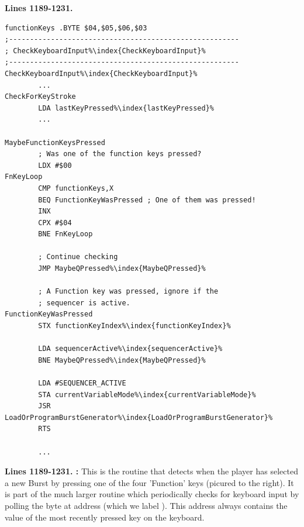 \clearpage
\textbf{Lines 1189-1231. }
\begin{lstlisting}[escapechar=\%]
functionKeys .BYTE $04,$05,$06,$03
;-------------------------------------------------------
; CheckKeyboardInput%\index{CheckKeyboardInput}%
;-------------------------------------------------------
CheckKeyboardInput%\index{CheckKeyboardInput}%   
        ...
CheckForKeyStroke   
        LDA lastKeyPressed%\index{lastKeyPressed}%
        ...

MaybeFunctionKeysPressed   
        ; Was one of the function keys pressed?
        LDX #$00
FnKeyLoop   
        CMP functionKeys,X
        BEQ FunctionKeyWasPressed ; One of them was pressed!
        INX 
        CPX #$04
        BNE FnKeyLoop

        ; Continue checking
        JMP MaybeQPressed%\index{MaybeQPressed}%

        ; A Function key was pressed, ignore if the 
        ; sequencer is active.
FunctionKeyWasPressed   
        STX functionKeyIndex%\index{functionKeyIndex}%

        LDA sequencerActive%\index{sequencerActive}%
        BNE MaybeQPressed%\index{MaybeQPressed}%

        LDA #SEQUENCER_ACTIVE
        STA currentVariableMode%\index{currentVariableMode}%
        JSR LoadOrProgramBurstGenerator%\index{LoadOrProgramBurstGenerator}%
        RTS 

        ...
\end{lstlisting}
\clearpage

\begin{figure}
%
\end{figure}
\textbf{Lines 1189-1231. :} This is the routine that detects when the player has selected a new
Burst by pressing one of the four 'Function' keys (picured to the right). It is part of the much larger routine  which periodically checks
for keyboard input by polling the byte at address  (which we label ). This address always
contains the value of the most recently pressed key on the keyboard.

